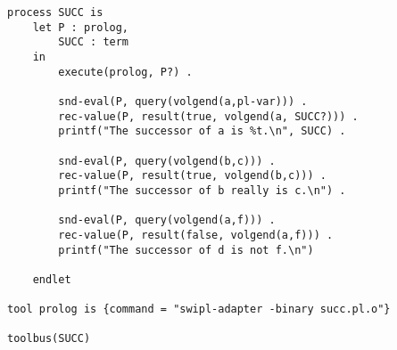 \begin{verbatim}
process SUCC is
    let P : prolog,
        SUCC : term
    in
        execute(prolog, P?) .

        snd-eval(P, query(volgend(a,pl-var))) .
        rec-value(P, result(true, volgend(a, SUCC?))) .
        printf("The successor of a is %t.\n", SUCC) .

        snd-eval(P, query(volgend(b,c))) .
        rec-value(P, result(true, volgend(b,c))) .
        printf("The successor of b really is c.\n") .

        snd-eval(P, query(volgend(a,f))) .
        rec-value(P, result(false, volgend(a,f))) .
        printf("The successor of d is not f.\n")

    endlet

tool prolog is {command = "swipl-adapter -binary succ.pl.o"}

toolbus(SUCC)
\end{verbatim}
